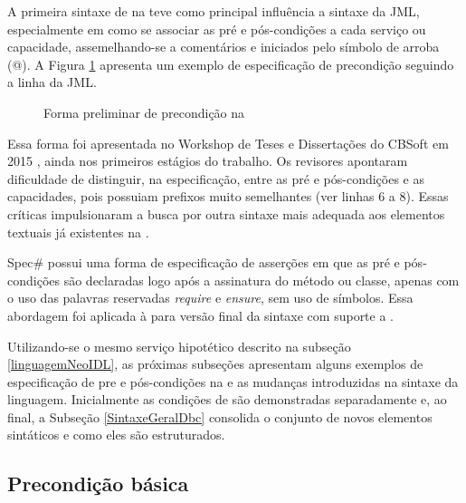 A primeira sintaxe de \designbycontract{} na \neoidl{} teve como
principal influência a sintaxe da JML, especialmente em como se associar as pré
e pós-condições a cada serviço ou capacidade, assemelhando-se a comentários e iniciados pelo
símbolo de arroba (@). A Figura \ref{lst:precondicaoJML-neo} apresenta um
exemplo de especificação de precondição seguindo a linha da JML.

\vspace{6mm}

\begin{figure}[h]
\begin{small}

\vspace{-.5cm} 
\end{small} 
\caption{Forma preliminar de precondição na \neoidl{}}
\label{lst:precondicaoJML-neo}
\end{figure}

Essa forma foi apresentada no Workshop de Teses e Dissertações do CBSoft em 2015
\cite{lima2015contratos}, ainda nos primeiros estágios do trabalho. Os revisores
apontaram dificuldade de distinguir, na especificação, entre as pré e
pós-condições e as capacidades, pois possuiam prefixos muito
semelhantes (ver linhas 6 a 8).
Essas críticas impulsionaram a busca por outra sintaxe mais adequada aos elementos textuais já
existentes na \neoidl{}.

Spec\# possui uma forma de especificação de asserções em que as pré e
pós-condições são declaradas logo após a assinatura do método ou classe, apenas
com o uso das palavras reservadas \emph{require} e \emph{ensure}, sem uso de
símbolos. Essa abordagem foi aplicada à \neoidl{} para versão final da sintaxe
com suporte a \designbycontract{}.

Utilizando-se o mesmo serviço hipotético descrito na subseção
\ref{linguagemNeoIDL}, as próximas subseções apresentam alguns
exemplos de especificação de pre e pós-condições na \neoidl{} e as mudanças introduzidas na sintaxe da linguagem.
Inicialmente as condições de \designbycontract{} são demonstradas separadamente e, ao final, a Subseção \ref{SintaxeGeralDbc} consolida o conjunto
de novos elementos sintáticos e como eles são estruturados.


\subsection{Precondição básica}
\label{precondicaoBasica}

